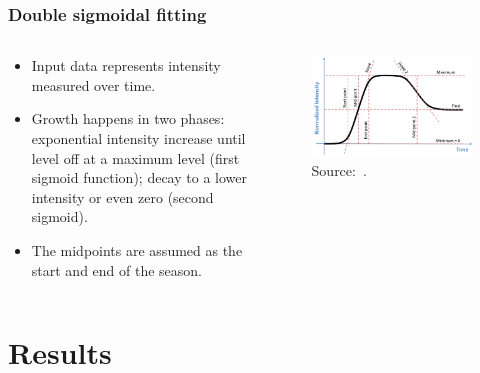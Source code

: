 \documentclass[aspectratio=169]{beamer}
\begin{document}
\begin{frame}
    \frametitle{Double sigmoidal fitting}
    \begin{columns}
        \begin{column}{0.5\linewidth}
            \begin{itemize}
                \item Input data represents intensity measured over time.
                \item Growth happens in two phases: exponential intensity
                    increase until level off at a maximum level (first
                    sigmoid function); decay to a lower intensity or even zero
                    (second sigmoid).
                \item The midpoints are assumed as the start and end of the
                    season.
            \end{itemize}
        \end{column}
        \begin{column}{0.5\linewidth}
            \begin{figure}[h]
                \includegraphics[width=0.99\linewidth]
                {./images/dsig_function.png}
                \caption{Source:~\cite{caglar2018}.}
            \end{figure}
        \end{column}
    \end{columns}
\end{frame}

\section{Results}
\end{document}
